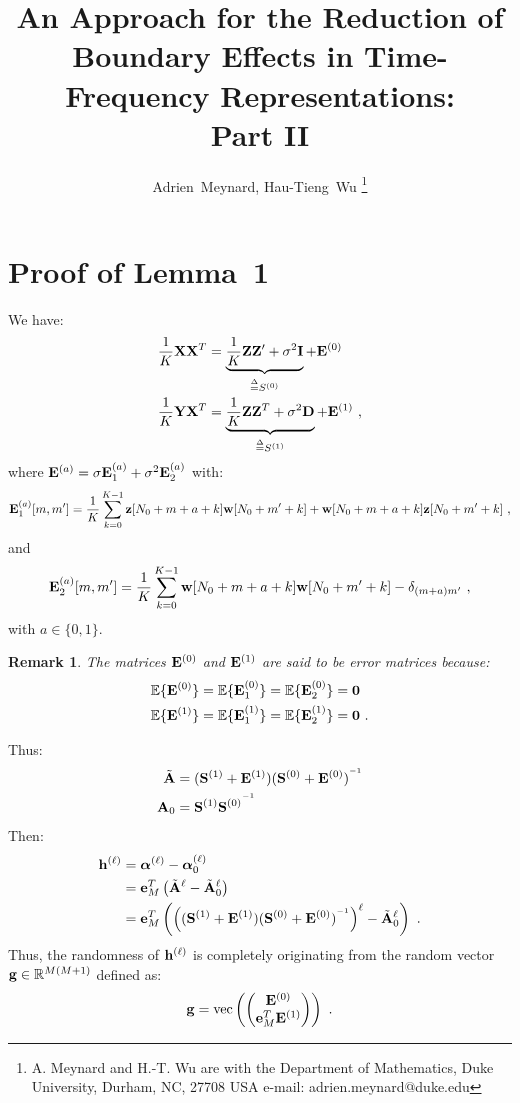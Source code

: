 \documentclass[journal, onecolumn]{IEEEtran}
\title{An Approach for the Reduction of Boundary Effects in Time-Frequency Representations:\\ Part II}
\author{Adrien~Meynard, %
        Hau-Tieng~Wu
\thanks{A. Meynard and H.-T. Wu are with the Department
of Mathematics, Duke University, Durham,
NC, 27708 USA e-mail: adrien.meynard@duke.edu}}
\newtheorem{remark}{Remark}
\begin{document}
\maketitle

\setcounter{equation}{8}
\setcounter{figure}{3}


\section{Proof of Lemma~1}
\label{ap:lm.error}
We have:
\begin{align}
\dfrac1K{\mathbf X}{\mathbf X}^T &= \underbrace{\dfrac1K{\mathbf Z}{\mathbf Z}'+\sigma^2{\mathbf I}}_{\overset{\Delta}{=} S^{(0)}} + {\mathbf E}^{(0)} \\
\dfrac1K{\mathbf Y}{\mathbf X}^T &= \underbrace{\dfrac1K{\mathbf Z}{\mathbf Z}^T +\sigma^2{\mathbf D}}_{\overset{\Delta}{=} S^{(1)}}+ {\mathbf E}^{(1)} \ ,
\end{align}
where ${\mathbf E}^{(a)} = \sigma{\mathbf E}_1^{(a)} + \sigma^2{\mathbf E}_2^{(a)}$ with:
\[
{\mathbf E}_1^{(a)}[m,m'] = \dfrac1K\sum_{k=0}^{K-1} {\mathbf z}[N_0+m+a+k]{\mathbf w}[N_0+m'+k] + {\mathbf w}[N_0+m+a+k]{\mathbf z}[N_0+m'+k]\ ,
\]
and
\[
{\mathbf E}_2^{(a)}[m,m'] =  \dfrac1K\sum_{k=0}^{K-1} {\mathbf w}[N_0+m+a+k]{\mathbf w}[N_0+m'+k] - \delta_{(m+a)m'}\ ,
\]
with $a\in\{0,1\}$.
\begin{remark}
The matrices ${\mathbf E}^{(0)}$ and ${\mathbf E}^{(1)}$ are said to be error matrices because:
\begin{align*}
{\mathbb E}\{{\mathbf E}^{(0)}\} &= {\mathbb E}\{{\mathbf E}_1^{(0)}\} = {\mathbb E}\{{\mathbf E}_2^{(0)}\} = \boldsymbol{0} \\
{\mathbb E}\{{\mathbf E}^{(1)}\} &= {\mathbb E}\{{\mathbf E}_1^{(1)}\} = {\mathbb E}\{{\mathbf E}_2^{(1)}\} = \boldsymbol{0}\ .
\end{align*}
\end{remark}
Thus:
\begin{align*}
\tilde{{\mathbf A}} &= ({\mathbf S}^{(1)}+{\mathbf E}^{(1)})({\mathbf S}^{(0)}+{\mathbf E}^{(0)})^{^{-1}} \\
{\mathbf A}_0&={\mathbf S}^{(1)}{{\mathbf S}^{(0)}}^{^{-1}}
\end{align*}
Then:
\begin{align}
\nonumber
\bh^{(\ell)} &= \balpha^{(\ell)} - \balpha^{(\ell)}_0 \\
\nonumber
&= \be_M^T\left(\tilde\bA^\ell-\tilde\bA_0^\ell\right) \\
&= \be_M^T\left(\left((\bS^{(1)}+\bE^{(1)})(\bS^{(0)}+\bE^{(0)})^\inv\right)^\ell- \tilde\bA_0^\ell\right)\ .
\label{eq:error.vec}
\end{align}
Thus, the randomness of ${\mathbf h}^{(\ell)}$ is completely originating from the random vector ${\mathbf g}\in{\mathbb R}^{M(M+1)}$ defined as:
\[
{\mathbf g} = {\mathrm{vec}}\left(
\begin{pmatrix}
{\mathbf E}^{(0)} \\
{\mathbf e}_M^T{\mathbf E}^{(1)}
\end{pmatrix}
\right)\ .
\]
\end{document}
